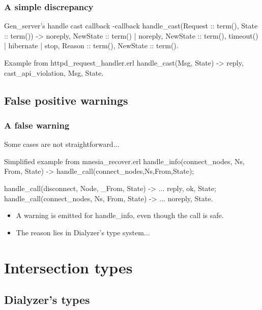 \documentclass{beamer}
\begin{document}
\begin{frame}[fragile]
  \frametitle{A simple discrepancy}
\begin{code}{Gen\_server's handle cast callback}
-callback handle_cast(Request :: term(),
                      State :: term()) ->
  {noreply, NewState :: term()} | 
  {noreply, NewState :: term(), timeout() | hibernate} | 
  {stop, Reason :: term(), NewState :: term()}.
\end{code}
\begin{code}{Example from httpd\_request\_handler.erl}
handle_cast(Msg, State) ->
    {reply, {cast_api_violation, Msg}, State}.
\end{code}
\end{frame}

\subsection{False positive warnings}

\begin{frame}[fragile]
  \frametitle{A false warning}
  Some cases are not straightforward...
\begin{code}{Simplified example from mnesia\_recover.erl}
  handle_info({connect_nodes, Ns, From}, State) ->
    handle_call({connect_nodes,Ns},From,State);

  handle_call({disconnect, Node}, _From, State) ->
    ...
    {reply, ok, State};
  handle_call({connect_nodes, Ns}, From, State) ->
    ...
    {noreply, State}.
\end{code}
  \pause
  \begin{itemize}
  \item A warning is emitted for handle\_info, even though the call is
    safe. \pause
  \item The reason lies in Dialyzer's type system...
  \end{itemize}
\end{frame}

\section{Intersection types}

\subsection{Dialyzer's types}
\end{document}
